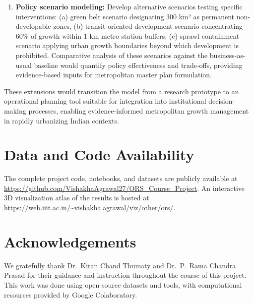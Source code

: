 \documentclass[12pt,a4paper]{article}
\begin{document}
\begin{enumerate}
\item \textbf{Policy scenario modeling:} Develop alternative scenarios testing specific interventions: (a) green belt scenario designating 300 km² as permanent non-developable zones, (b) transit-oriented development scenario concentrating 60\% of growth within 1 km metro station buffers, (c) sprawl containment scenario applying urban growth boundaries beyond which development is prohibited. Comparative analysis of these scenarios against the business-as-usual baseline would quantify policy effectiveness and trade-offs, providing evidence-based inputs for metropolitan master plan formulation.
\end{enumerate}

These extensions would transition the model from a research prototype to an operational planning tool suitable for integration into institutional decision-making processes, enabling evidence-informed metropolitan growth management in rapidly urbanizing Indian contexts.



\section{Data and Code Availability}

The complete project code, notebooks, and datasets are publicly available at \url{https://github.com/VishakhaAgrawal27/ORS_Course_Project}. An interactive 3D visualization atlas of the results is hosted at \url{https://web.iiit.ac.in/~vishakha.agrawal/viz/other/ors/}.

\section{Acknowledgements}

We gratefully thank Dr.\ Kiran Chand Thumaty and Dr.\ P.\ Rama Chandra Prasad for their guidance and instruction throughout the course of this project. This work was done using open-source datasets and tools, with computational resources provided by Google Colaboratory.
\end{document}
